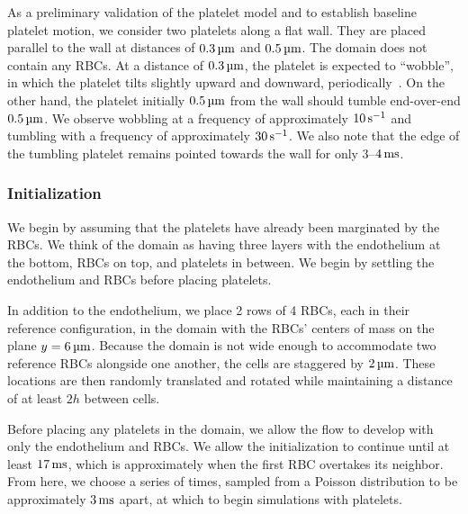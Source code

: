 As a preliminary validation of the platelet model and to establish baseline platelet
motion, we consider two platelets along a flat wall. They are placed parallel to the wall
at distances of $0.3\um$ and $0.5\um$. The domain does not contain any RBCs. At a
distance of $0.3\um$, the platelet is expected to ``wobble'', in which the platelet tilts
slightly upward and downward, periodically~\cite{King:2005fv}. On the other hand, the
platelet initially $0.5\um$ from the wall should tumble end-over-end $0.5\um$. We observe
wobbling at a frequency of approximately $10\persec$ and tumbling with a frequency of
approximately $30\persec$. We also note that the edge of the tumbling platelet remains
pointed towards the wall for only 3--$4\ms$.

\subsubsection{Initialization}\label{sec:blood-init}

We begin by assuming that the platelets have already been marginated by the RBCs. We
think of the domain as having three layers with the endothelium at the bottom, RBCs on
top, and platelets in between. We begin by settling the endothelium and RBCs before
placing platelets.

In addition to the endothelium, we place 2 rows of 4 RBCs, each in their reference
configuration, in the domain with the RBCs' centers of mass on the plane $y=6\um$.
Because the domain is not wide enough to accommodate two reference RBCs alongside one
another, the cells are staggered by $2\um$. These locations are then randomly translated
and rotated while maintaining a distance of at least $2h$ between cells.

Before placing any platelets in the domain, we allow the flow to develop with only the
endothelium and RBCs. We allow the initialization to continue until at least $17\ms$,
which is approximately when the first RBC overtakes its neighbor. From here, we choose a
series of times, sampled from a Poisson distribution to be approximately $3\ms$ apart, at
which to begin simulations with platelets.


